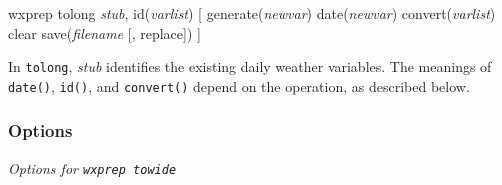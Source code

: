 \begin{stsyntax}
	wxprep tolong {\it stub\/}, id({\it varlist\/})
	[ generate({\it newvar\/}) date({\it newvar\/})
	convert({\it varlist\/}) clear save({\it filename\/} [, replace]) ]
\end{stsyntax}

\noindent In \texttt{tolong}, \textit{stub} identifies the existing daily weather variables. The meanings of \texttt{date()}, \texttt{id()}, and \texttt{convert()} depend on the operation, as described below.

\subsubsection{Options}

\noindent\textit{Options for \texttt{wxprep towide}}

